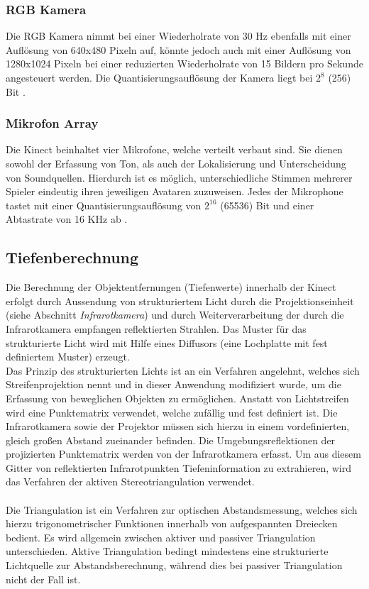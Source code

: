 \subsubsection{RGB Kamera}
Die RGB Kamera nimmt bei einer Wiederholrate von 30 Hz ebenfalls mit einer Auflösung von 640x480 Pixeln auf, könnte jedoch auch mit einer Auflösung von 1280x1024 Pixeln bei einer reduzierten Wiederholrate von 15 Bildern pro Sekunde angesteuert werden.
Die Quantisierungsauflösung der Kamera liegt bei $2^{8}$ (256) Bit \cite{microsoftdocu}. 
\subsubsection{Mikrofon Array}
Die Kinect beinhaltet vier Mikrofone, welche verteilt verbaut sind. Sie dienen sowohl der Erfassung von Ton, als auch der Lokalisierung und Unterscheidung von Soundquellen. Hierdurch ist es möglich, unterschiedliche Stimmen mehrerer Spieler eindeutig ihren jeweiligen Avataren zuzuweisen. Jedes der Mikrophone tastet mit einer Quantisierungsauflösung von $2^{16}$ (65536) Bit und einer Abtastrate von 16 KHz ab \cite{microsoftdocu}.
\subsection{Tiefenberechnung}
Die Berechnung der Objektentfernungen (Tiefenwerte) innerhalb der Kinect erfolgt durch Aussendung von strukturiertem Licht durch die Projektionseinheit (siehe Abschnitt \emph{Infrarotkamera}) und durch Weiterverarbeitung der durch die Infrarotkamera empfangen reflektierten Strahlen. Das Muster für das strukturierte Licht wird mit Hilfe eines Diffusors (eine Lochplatte mit fest definiertem Muster) erzeugt.\\
Das Prinzip des strukturierten Lichts ist an ein Verfahren angelehnt, welches sich Streifenprojektion nennt und in dieser Anwendung modifiziert wurde, um die Erfassung von beweglichen Objekten zu ermöglichen. Anstatt von Lichtstreifen wird eine Punktematrix verwendet, welche zufällig und fest definiert ist. Die Infrarotkamera sowie der Projektor müssen sich hierzu in einem vordefinierten, gleich großen Abstand zueinander befinden.
Die Umgebungsreflektionen der projizierten Punktematrix werden von der Infrarotkamera erfasst.
Um aus diesem Gitter von reflektierten Infrarotpunkten Tiefeninformation zu extrahieren, wird das Verfahren der aktiven Stereotriangulation verwendet.\\\\
Die Triangulation ist ein Verfahren zur optischen Abstandsmessung, welches sich hierzu trigonometrischer Funktionen innerhalb von aufgespannten Dreiecken bedient. 
Es wird allgemein zwischen aktiver und passiver Triangulation unterschieden.
Aktive Triangulation bedingt mindestens eine strukturierte Lichtquelle zur Abstandsberechnung, während dies bei passiver Triangulation nicht der Fall ist\cite{triangulation}.\\

